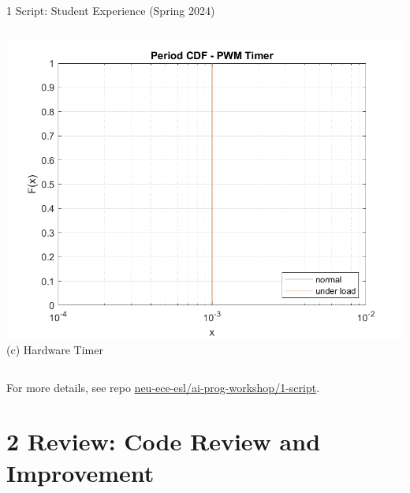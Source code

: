 \documentclass[xcolor={dvipsnames,table}, aspectratio=169]{beamer}
\newcommand{\footername}{AI in Programming Education}
\newcommand{\setfooter}[2]{\renewcommand{\footername}{\href{#2}{#1}}}
\begin{document}
\begin{frame}{1 Script: Student Experience (Spring 2024)}
\begin{columns}
        \includegraphics[width=\textwidth]{../1-script/period_timer.png}
        \tiny\centering (c) Hardware Timer
    \end{columns}
    \vspace{0.5em}
    \tiny For more details, see repo \href{https://github.com/neu-ece-esl/ai-prog-workshop/tree/main/1-script}{neu-ece-esl/ai-prog-workshop/1-script}.  
\end{frame}


\section{2 Review: Code Review and Improvement}
\setfooter{2 Review}{https://github.com/neu-ece-esl/ai-prog-workshop/tree/main/2-review}
\end{document}
